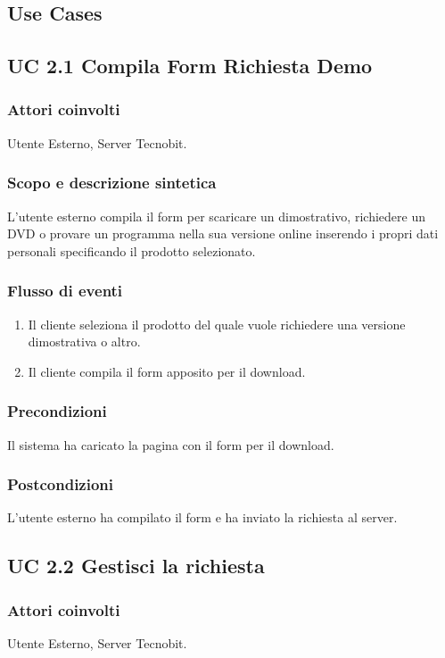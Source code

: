 \subsection{Use Cases}

\subsection*{UC 2.1 Compila Form Richiesta Demo}
\subsubsection*{Attori coinvolti} Utente Esterno, Server Tecnobit.
\subsubsection*{Scopo e descrizione sintetica}
L'utente esterno compila il form per scaricare un dimostrativo, richiedere un DVD o provare un programma nella sua 
versione online inserendo i propri dati personali specificando il prodotto selezionato.
\subsubsection*{Flusso di eventi}
\begin{enumerate}
\item Il cliente seleziona il prodotto del quale vuole richiedere una versione dimostrativa o altro.
\item Il cliente compila il form apposito per il download.
\end{enumerate}
\subsubsection*{Precondizioni} Il sistema ha caricato la pagina con il form per il download.
\subsubsection*{Postcondizioni} L'utente esterno ha compilato il form e ha inviato la richiesta al server.

\subsection*{UC 2.2 Gestisci la richiesta}
\subsubsection*{Attori coinvolti} Utente Esterno, Server Tecnobit.
